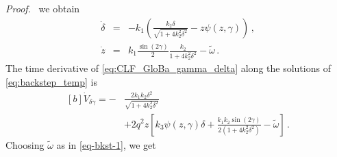 \documentclass[journal,twoside,web]{ieeecolor}
\theoremstyle{definition}
\renewenvironment{proof}[1][Proof]{\par\pushQED{\qed}\normalfont\textit{#1.}~}{\popQED\par}
\begin{document}
\begin{proof}
we obtain
\begin{subequations}
\label{eq:backstep_temp}
\begin{eqnarray}
\dot{\delta} &=& - k_1 \left( \frac{k_2 \delta}{\sqrt{1+4k_2^2\delta^2}}
- z \psi(z,\gamma) \right) \,, \label{eq:delta_globa} \\
\dot{z} &=&  k_1 \frac{\sin(2\gamma)}{2} \frac{k_2}{1+4k_2^2\delta^2} - \tilde{\omega}\,.  \label{eq:z_globa}
\end{eqnarray}
\end{subequations}
The time derivative of \eqref{eq:CLF_GloBa_gamma_delta}
along the solutions of \eqref{eq:backstep_temp} is
\begin{equation}
\begin{aligned}[b]
\dot V_{\delta \gamma} = -&\frac{2 k_1 k_2  \delta^2}{\sqrt{1+4 k_2^2 \delta^2}} \\ &+   2 q^2 z \left[  k_3 \psi(z,\gamma) \delta   +  \frac{k_1 k_2 \sin (2\gamma)}{2 (1+4k_2^2\delta^2)} - \tilde{\omega}\right]\,.\label{eq-V1dot-bkst1}
\end{aligned}
\end{equation}
 Choosing $\tilde{\omega}$ as in \eqref{eq-bkst-1}, 
we get
\begin{equation}

\end{equation}
\end{proof}
\end{document}
